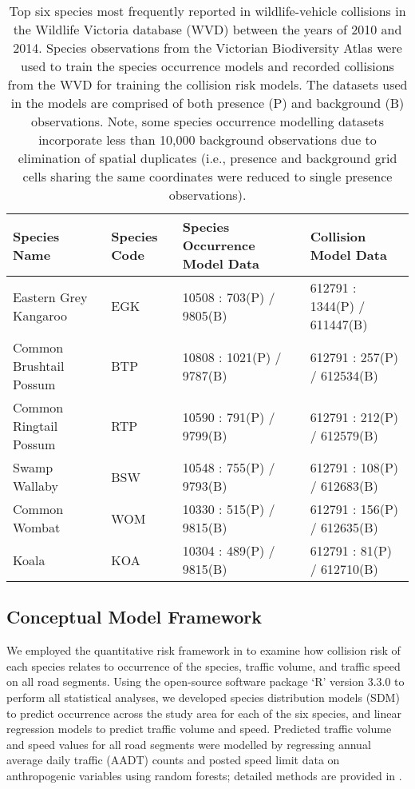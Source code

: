 \begin{table}[!h]
\caption[Six mammal species most frequently reported in wildlife-vehicle collisions]{Top six species most frequently reported in wildlife-vehicle collisions in the Wildlife Victoria database (WVD) between the years of 2010 and 2014. Species observations from the Victorian Biodiversity Atlas were used to train the species occurrence models and recorded collisions from the WVD for training the collision risk models. The datasets used in the models are comprised of both presence (P) and background (B) observations. Note, some species occurrence modelling datasets incorporate less than 10,000 background observations due to elimination of spatial duplicates (i.e., presence and background grid cells sharing the same coordinates were reduced to single presence observations).}
\centering
\renewcommand{\arraystretch}{1.5}
\begin{tabularx}{0.9\textwidth}{@{}Ylll@{}} \toprule
Species Name                     &Species Code     &Species Occurrence Model Data     &Collision Model Data \\ \midrule 
Eastern Grey Kangaroo 	& EGK	& 10508 : 703(P) / 9805(B) 	& 612791 : 1344(P) / 611447(B) \\ 
Common Brushtail Possum & BTP	& 10808 : 1021(P) / 9787(B)	& 612791 : 257(P) / 612534(B) \\ 
Common Ringtail Possum 	& RTP	& 10590 : 791(P) / 9799(B)	& 612791 : 212(P) / 612579(B) \\ 
Swamp Wallaby		 	& BSW	& 10548 : 755(P) / 9793(B) 	& 612791 : 108(P) / 612683(B) \\ 
Common Wombat 			& WOM	& 10330 : 515(P) / 9815(B) 	& 612791 : 156(P) / 612635(B) \\ 
Koala 					& KOA 	& 10304 : 489(P) / 9815(B) 	& 612791 : 81(P) / 612710(B) \\ 
\bottomrule
\end{tabularx}
\label{6sp_species_data}
\end{table}

\subsection{Conceptual Model Framework}

We employed the quantitative risk framework in  to examine how collision risk of each species relates to occurrence of the species, traffic volume, and traffic speed on all road segments. Using the open-source software package `R' version 3.3.0 \citep{rdct16} to perform all statistical analyses, we developed species distribution models (SDM) to predict occurrence across the study area for each of the six species, and linear regression models to predict traffic volume and speed. Predicted traffic volume and speed values for all road segments were modelled by regressing annual average daily traffic (AADT) counts and posted speed limit data on anthropogenic variables using random forests; detailed methods are provided in . 


